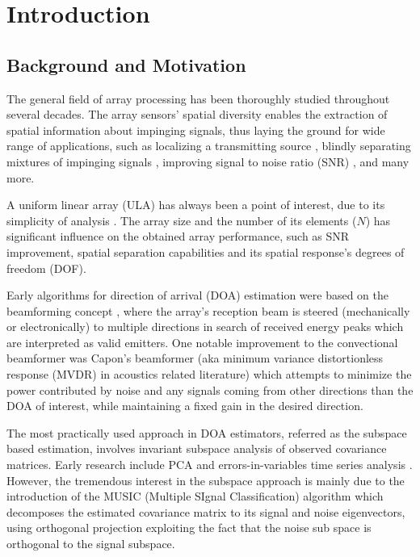 \chapter{Introduction}
\label{chap:intro}
\section{Background and Motivation}
The general field of array processing has been thoroughly studied throughout several decades.
The array sensors' spatial diversity enables the extraction of spatial information about impinging signals, thus laying the ground for wide range of applications, such as localizing a transmitting source \cite{skolnik2008radar,long2019}, blindly separating mixtures of impinging signals \cite{comon1994independent}, improving signal to noise ratio (SNR) \cite{verdu1998multiuser}, and many more. 
\par A uniform linear array (ULA) has always been a point of interest, due to its simplicity of analysis \cite{van2004optimum,benesty2018}. 
The array size and the number of its elements ($N$) has significant influence on the obtained array performance, such as SNR improvement, spatial separation capabilities and its spatial response's degrees of freedom (DOF).
\par Early algorithms for direction of arrival (DOA) estimation were based on the beamforming concept \cite{krim1996two}, where the array's reception beam is steered (mechanically or electronically) to multiple directions in search of received energy peaks which are interpreted as valid emitters.
One notable improvement to the convectional beamformer \cite{van2004optimum} was Capon's beamformer  (aka minimum variance distortionless response (MVDR) in acoustics related literature) which attempts to minimize the power contributed by noise and any signals coming from other directions than the DOA of interest, while maintaining a fixed gain
in the desired direction.
\par The most practically used approach in DOA estimators, referred as the subspace based estimation, involves invariant subspace analysis of observed covariance matrices.
Early research include PCA and errors-in-variables time series analysis \cite{krim1996two}.   
However, the tremendous interest in the subspace approach is mainly due to the introduction of the
MUSIC (Multiple SIgnal Classification) algorithm \cite{schmidt1986multiple} which decomposes the estimated covariance matrix to its signal and noise eigenvectors, using orthogonal projection exploiting the fact that the noise sub space is orthogonal to the signal subspace.
